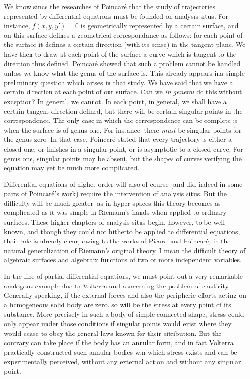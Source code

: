 \documentclass[12pt,oneside]{book}
\begin{document}
We know since the researches of Poincar\'e that the study of trajectories represented by differential equations must be founded on analysis situs. For instance, $f(x,y,y')=0$ is geometrically represented by a certain surface, and on this surface defines a geometrical correspondance as follows: for each point of the surface it defines a certain direction (with its sense) in the tangent plane. We have then to draw at each point of the surface a curve which is tangent to the direction thus defined. Poincar\'e showed that such a problem cannot be handled unless we know what the genus of the surface is. This already appears ina simple preliminary question which arises in that study. We have said that we have a certain direction at each point of our surface. Can we \textit{in general} do this without exception? In general, we cannot. In each point, in general, we shall have a certain tangent direction defined, but there will be certain singular points in the correspondence. The only case in which the correspondence can be complete is when the surface is of genus one. For instance, there \textit{must} be singular points for the genus zero. In that case, Poincar\'e stated that every trajectory is either a closed one, or finishes in a singular point, or is asymptotic to a closed curve. For genus one, singular points may be absent, but the shapes of curves verifying the equation may yet be much more complicated. \par 

Differential equations of higher order will also of course (and did indeed in some parts of Poincar\'e's work) require the intervention of analysis situs. But the difficulty will be much greater, as in hyper-spaces this theory becomes as complicated as it was simple in Riemann's hands when applied to ordinary surfaces. These higher chapters of analysis situs begin, however, to be well known, and though they could not hitherto be applied to differential equations, their role is already clear, owing to the works of Picard and Poincar\'e, in the natural generalization of Riemann's original theory. I mean the difficult theory of algebraic surfaces and algebraix functions of two or more independent variables. \par 

In the line of partial differential equations, we must point out a very remarkable analogous example due to Volterra and concerning the problem of elasticity. Generally speaking, if the external forces and also the peripheric efforts acting on a homogeneous solid body are zero. so will be the stress at every point of its substance. More precisely in such a body of simple connected shape, stress could only appear under those conditions if singular points would exist where they would cease to obey the general laws known for their sitribution. But the contrary can take place if the body has an annular form, and in fact Volterra practically constructed such annular bodies win which stress exists and can be experimentally perceived, without any external action and without any singular point. \par 
\end{document}
